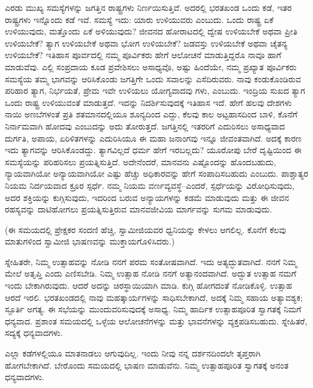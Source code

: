 ಎರಡು ಮುಖ್ಯ ಸಮಸ್ಯೆಗಳನ್ನು ಜಗತ್ತಿನ ರಾಷ್ಟ್ರಗಳು ನಿರ್ಣಯಿಸುತ್ತಿವೆ. ಅದರಲ್ಲಿ ಭರತಖಂಡ ಒಂದು ಕಡೆ, ಇತರ ರಾಷ್ಟ್ರಗಳು ಇನ್ನೊಂದು ಕಡೆ ಇವೆ. ಸಮಸ್ಯೆ ಇದು: ಯಾರು ಉಳಿಯುವರು ಎಂಬುದು. ಒಂದು ರಾಷ್ಟ್ರ ಏಕೆ ಉಳಿಯುವುದು, ಮತ್ತೊಂದು ಏಕೆ ಅಳಿಯುವುದು? ಜೀವನದ ಹೋರಾಟದಲ್ಲಿ ದ್ವೇಷ ಉಳಿಯಬೇಕೆ ಅಥವಾ ಪ್ರೀತಿ ಉಳಿಯಬೇಕೆ? ತ್ಯಾಗ ಉಳಿಯಬೇಕೆ ಅಥವಾ ಭೋಗ ಉಳಿಯಬೇಕೆ? ಜಡವಸ್ತು ಉಳಿಯಬೇಕೆ ಅಥವಾ ಚೈತನ್ಯ ಉಳಿಯಬೇಕೆ? ಇತಿಹಾಸ ಪೂರ್ವದಲ್ಲಿ ನಮ್ಮ ಪೂರ್ವಿಕರು ಹೇಗೆ ಆಲೋಚನೆ ಮಾಡುತ್ತಿದ್ದರೊ ನಾವೂ ಹಾಗೆ ಮಾಡುವೆವು. ಎಲ್ಲಿ ಸಂಪ್ರದಾಯ ಕೂಡ ಪ್ರವೇಶಿಸಲು ಅಸಾಧ್ಯವೊ, ಅಷ್ಟು ಹಿಂದೆಯೇ, ನಮ್ಮ ಪ್ರಖ್ಯಾತ ಪೂರ್ವಿಕರು ಸಮಸ್ಯೆಯ ತಮ್ಮ ಭಾಗವನ್ನು ಆರಿಸಿಕೊಂಡು ಜಗತ್ತಿಗೇ ಒಂದು ಸವಾಲನ್ನು ಎಸೆದಿರುವರು. ನಾವು ಕಂಡುಕೊಂಡಿರುವ ಪರಿಹಾರ ತ್ಯಾಗ, ನಿರ್ಭಯತೆ, ಪ್ರೇಮ ಇವೇ ಉಳಿಯಲು ಯೋಗ್ಯವಾದವು ಗಳು, ಎಂಬುದು. ಇಂದ್ರಿಯ ಸುಖದ ತ್ಯಾಗ ಒಂದು ರಾಷ್ಟ್ರ ಉಳಿಯುವಂತೆ ಮಾಡುತ್ತದೆ. ಇದನ್ನು ನಿದರ್ಶಿಸುವುದಕ್ಕೆ ಇತಿಹಾಸ ಇದೆ. ಹೇಗೆ ಹಲವು ದೇಶಗಳು ನಾಯಿ ಅಣಬೆಗಳಂತೆ ಪ್ರತಿ ಶತಮಾನದಲ್ಲಿಯೂ ಶೂನ್ಯದಿಂದ ಎದ್ದು, ಕೆಲವು ಕಾಲ ಅಟ್ಟಹಾಸದಿಂದ ಬಾಳಿ, ಕೊನೆಗೆ ನಿರ್ನಾಮವಾಗಿ ಹೋದವು ಎಂಬುದನ್ನು ಅದು ತೋರುತ್ತದೆ. ಜಗತ್ತಿನಲ್ಲಿ ಇತರರಿಗೆ ಎದುರಿಸಲು ಅಸಾಧ್ಯವಾದ ದುರ್ಗತಿ, ಅಪಾಯ, ಏರಿಳಿತಗಳನ್ನು ಎದುರಿಸಿಯೂ ಈ ಮಹಾ ಜನಾಂಗವು ಇನ್ನೂ ಜೀವಂತವಾಗಿದೆ. ಅದಕ್ಕೆ ಕಾರಣ ಇದು ತ್ಯಾಗವನ್ನು ಆರಿಸಿಕೊಂಡದ್ದು. ತ್ಯಾಗವಿಲ್ಲದೆ ಧರ್ಮ ಹೇಗೆ ಇರಬಲ್ಲದು? ಯೂರೋಪು ಬೇರೆ ದೃಷ್ಟಿಯಿಂದ ಈ ಸಮಸ್ಯೆಯನ್ನು ಪರಿಹರಿಸಲು ಪ್ರಯತ್ನಿಸುತ್ತಿದೆ. ಅದೇನೆಂದರೆ, ಮಾನವನು ಎಷ್ಟೊಂದನ್ನು ಹೊಂದಬಹುದು, ನ್ಯಾಯವಾಗಿಯೋ ಅನ್ಯಾಯವಾಗಿಯೋ ಎಷ್ಟು ಹೆಚ್ಚು ಅಧಿಕಾರವನ್ನು ಹೇಗೆ ಸಂಪಾದಿಸಬಹುದು ಎಂಬುದು. ಪಾಶ್ಚಾತ್ಯರ ನಿಯಮ ನಿರ್ದಯವಾದ ಕ್ರೂರ ಸ್ಪರ್ಧೆ. ನಮ್ಮ ನಿಯಮ ವರ್ಣವ್ಯವಸ್ಥೆ–ಎಂದರೆ, ಸ್ಪರ್ಧೆಯನ್ನು ವಿರೋಧಿಸುವುದು, ಅದರ ಶಕ್ತಿಯನ್ನು ಕುಗ್ಗಿಸುವುದು, ಇದರಿಂದ ಬರುವ ಅನ್ಯಾಯಗಳನ್ನು ಕಡಮೆ ಮಾಡುವುದು ಮತ್ತು ಈ ಜೀವನ ರಹಸ್ಯವನ್ನು ದಾಟಿಹೋಗಲು ಪ್ರಯತ್ನಿಸುತ್ತಿರುವ ಮಾನವಜೀವಿಯ ಮಾರ್ಗವನ್ನು ಸುಗಮ ಮಾಡುವುದು. 

(ಈ ಸಮಯದಲ್ಲಿ ಪ್ರೇಕ್ಷಕರ ಸಂದಣಿ ಹೆಚ್ಚಿ, ಸ್ವಾಮೀಜಿಯವರ ಧ್ವನಿಯನ್ನು ಕೇಳಲು ಆಗಲಿಲ್ಲ. ಕೊನೆಗೆ ಕೆಲವು ಮಾತುಗಳಿಂದ ಸ್ವಾಮೀಜಿ ಭಾಷಣವನ್ನು ಮುಕ್ತಾಯಗೊಳಿಸಿದರು.)

ಸ್ನೇಹಿತರೇ, ನಿಮ್ಮ ಉತ್ಸಾಹವನ್ನು ನೋಡಿ ನನಗೆ ಪರಮ ಸಂತೋಷವಾಗಿದೆ. ಇದು ಅತ್ಯದ್ಭುತವಾಗಿದೆ. ನನಗೆ ನಿಮ್ಮ ಮೇಲೆ ಅತೃಪ್ತಿ ಎಂದು ಎಣಿಸಬೇಡಿ. ನಿಮ್ಮ ಉತ್ಸಾಹ ನೋಡಿ ನನಗೆ ಅತ್ಯಾನಂದವಾಗಿದೆ. ಅದ್ಭುತ ಉತ್ಸಾಹ ನಮಗೆ ಇಂದು ಬೇಕಾಗಿರುವುದು. ಆದರೆ ಅದನ್ನು ಚಿರಸ್ಥಾಯಿಯಾಗಿ ಮಾಡಿ. ಕುಗ್ಗಿ ಹೋಗದಂತೆ ನೋಡಿಕೊಳ್ಳಿ. ಉತ್ಸಾಹ ಆರದೆ ಇರಲಿ. ಭರತಖಂಡದಲ್ಲಿ ನಾವು ಮಹತ್ಕಾರ್ಯಗಳನ್ನು ಸಾಧಿಸಬೇಕಾಗಿದೆ, ಅದಕ್ಕೆ ನಿಮ್ಮ ಸಹಾಯ ಅತ್ಯಾವಶ್ಯಕ; ಸ್ಫೂರ್ತಿ ಅಗತ್ಯ. ಈ ಸಭೆಯನ್ನು ಮುಂದುವರಿಸುವುದಕ್ಕೆ ಅಸಾಧ್ಯ. ನಿಮ್ಮ ಹಾರ್ದಿಕ ಉತ್ಸಾಹಪೂರಿತ ಸ್ವಾಗತಕ್ಕೆ ನಿಮಗೆ ಧನ್ಯವಾದ. ಪ್ರಶಾಂತ ಸಮಯದಲ್ಲಿ ಒಳ್ಳೆಯ ಆಲೋಚನೆಗಳನ್ನು ಮತ್ತು ಭಾವನೆಗಳನ್ನು ವ್ಯಕ್ತಪಡಿಸಬಹುದು. ಸ್ನೇಹಿತರೆ, ಸದ್ಯಕ್ಕೆ ಧನ್ಯವಾದಗಳು. 

ಎಲ್ಲಾ ಕಡೆಗಳಲ್ಲಿಯೂ ಮಾತನಾಡಲು ಆಗುವುದಿಲ್ಲ. ಇಂದು ನೀವು ನನ್ನ ದರ್ಶನದಿಂದಲೇ ತೃಪ್ತರಾಗಿ ಹೋಗಬೇಕಾಗಿದೆ. ಬೇರೊಂದು ಸಮಯದಲ್ಲಿ ಭಾಷಣ ಮಾಡುವೆನು. ನಿಮ್ಮ ಉತ್ಸಾಹಪೂರಿತ ಸ್ವಾಗತಕ್ಕೆ ಅನಂತ ಧನ್ಯವಾದಗಳು. 

